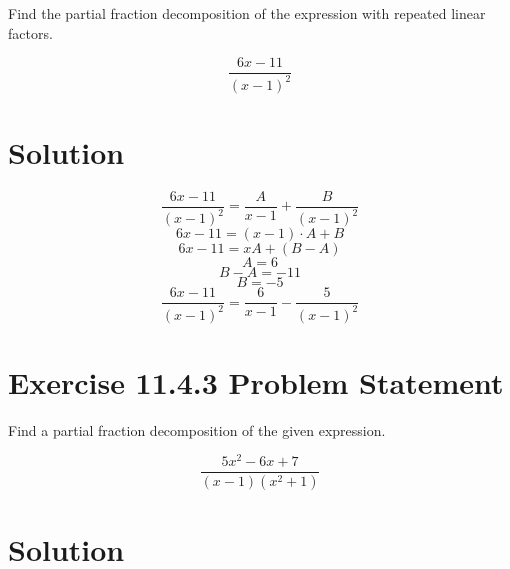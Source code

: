 \documentclass{article}
\begin{document}
Find the partial fraction decomposition of the expression with repeated linear factors.

\begin{equation*}
    \frac{6x - 11}{(x-1)^2}
\end{equation*}

\section*{Solution}

\begin{equation*}
    \frac{6x - 11}{(x-1)^2} = \frac{A}{x - 1} + \frac{B}{(x - 1)^2}
\end{equation*}
\begin{equation*}
    6x - 11 = (x - 1) \cdot A + B
\end{equation*}
\begin{equation*}
    6x - 11 = x A + (B - A)
\end{equation*}
\begin{equation*}
    A = 6
\end{equation*}
\begin{equation*}
    B - A = -11
\end{equation*}
\begin{equation*}
    B = -5
\end{equation*}
\begin{equation*}
    \frac{6x - 11}{(x-1)^2} = \frac{6}{x - 1} - \frac{5}{(x - 1)^2}
\end{equation*}

\section*{Exercise 11.4.3 Problem Statement}

Find a partial fraction decomposition of the given expression.

\begin{equation*}
    \frac{5x^2 - 6x + 7}{(x-1)(x^2 + 1)}
\end{equation*}

\section*{Solution}
\end{document}
